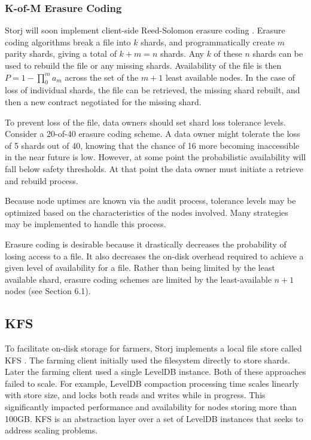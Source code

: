 \documentclass[a4paper,10pt]{article}
\begin{document}
\subsubsection{K-of-M Erasure Coding}
Storj will soon implement client-side Reed-Solomon erasure coding \cite{27}. Erasure coding algorithms break a file into $ k $ shards, and programmatically create $ m $ parity shards, giving a total of $ k + m = n $ shards. Any $ k $ of these $ n $ shards can be used to rebuild the file or any missing shards. Availability of the file is then $ P = 1 - \prod_{0}^{m} a_{m} $  across the set of the $m + 1$ least available nodes. In the case of loss of individual shards, the file can be retrieved, the missing shard rebuilt, and then a new contract negotiated for the missing shard.

To prevent loss of the file, data owners should set shard loss tolerance levels. Consider a 20-of-40 erasure coding scheme. A data owner might tolerate the loss of 5 shards out of 40, knowing that the chance of 16 more becoming inaccessible in the near future is low. However, at some point the probabilistic availability will fall below safety thresholds. At that point the data owner must initiate a retrieve and rebuild process.

Because node uptimes are known via the audit process, tolerance levels may be optimized based on the characteristics of the nodes involved. Many strategies may be implemented to handle this process.

Erasure coding is desirable because it drastically decreases the probability of losing access to a file. It also decreases the on-disk overhead required to achieve a given level of availability for a file. Rather than being limited by the least available shard, erasure coding schemes are limited by the least-available $ n + 1 $ nodes (see Section 6.1).

\subsection{KFS}
To facilitate on-disk storage for farmers, Storj implements a local file store called KFS \cite{12}. The farming client initially used the filesystem directly to store shards. Later the farming client used a single LevelDB instance. Both of these approaches failed to scale. For example, LevelDB compaction processing time scales linearly with store size, and locks both reads and writes while in progress. This significantly impacted performance and availability for nodes storing more than 100GB. KFS is an abstraction layer over a set of LevelDB instances that seeks to address scaling problems.
\end{document}
